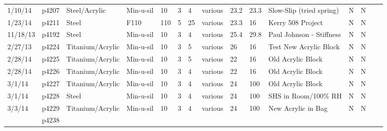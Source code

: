 \begin{landscape}
\begin{longtable}{lllllllllllllll}
1/10/14  & p4207      & Steel/Acrylic    & Min-u-sil    & 10           & 3         & 4             & various                      & 23.2        & 23.3     & Slow-Slip (tried spring)                        & N     & N    &  &  \\
1/23/14  & p4211      & Steel            & F110         & 110          & 5         & 25            & various                      & 23.3        & 16       & Kerry 508 Project                               & N     & N    &  &  \\
11/18/13 & p4192      & Steel            & Min-u-sil    & 10           & 3         & 4             & various                      & 25.4        & 29.8     & Paul Johnson - Stiffness                        & N     & N    &  &  \\
2/27/13  & p4224      & Titanium/Acrylic & Min-u-sil    & 10           & 3         & 5             & various                      & 26          & 16       & Test New Acrylic Block                          & N     & N    &  &  \\
2/28/14  & p4225      & Titanium/Acrylic & Min-u-sil    & 10           & 3         & 5             & various                      & 22          & 16       & Old Acrylic Block                               & N     & N    &  &  \\
2/28/14  & p4226      & Titanium/Acrylic & Min-u-sil    & 10           & 3         & 4             & various                      & 22          & 16       & Old Acrylic Block                               & N     & N    &  &  \\
3/1/14   & p4227      & Titanium/Acrylic & Min-u-sil    & 10           & 3         & 4             & various                      & 24          & 100      & Old Acrylic Block                               & N     & N    &  &  \\
3/1/14   & p4228      & Steel            & Min-u-sil    & 10           & 3         & 4             & various                      & 24          & 100      & SHS in Room/100\% RH                            & N     & N    &  &  \\
3/3/14   & p4229      & Titanium/Acrylic & Min-u-sil    & 10           & 3         & 4             & various                      & 24          & 100      & New Acrylic in Bag                              & N     & N    &  &  \\
         & p4238      &                  &              &              &           &               &                              &             &          &                                                 &       &      &  &  \\

\end{longtable}
\end{landscape}
